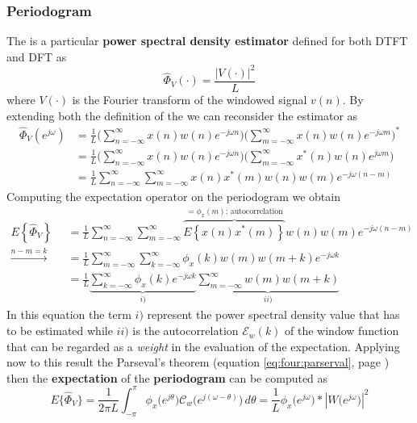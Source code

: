 		\subsubsection{Periodogram}
		The  is a particular \textbf{power spectral density estimator} defined for both DTFT and DFT as
		\begin{equation} \label{eq:dft:periodogram}
			\hat \Phi_V(\cdot) = \frac{|V(\cdot)|^2}{L}
		\end{equation}
		where $V(\cdot)$ is the Fourier transform of the windowed signal $v(n)$. By extending both the definition of the \dtft we can reconsider the estimator as
		\begin{align*}
			\hat \Phi_V(e^{j\omega}) & = \frac 1 L \Big( \sum_{n=-\infty}^\infty x(n) w(n) e^{-j\omega n} \Big)\Big( \sum_{m=-\infty}^\infty x(n) w(n) e^{-j\omega m} \Big)^* \\ & = \frac 1 L \Big( \sum_{n=-\infty}^\infty x(n) w(n) e^{-j\omega n} \Big) \Big( \sum_{m=-\infty}^\infty x^*(n) w(n) e^{j\omega m} \Big) \\ 
			& = \frac 1 L \sum_{n=-\infty}^\infty\sum_{m=-\infty}^\infty x(n) x^*(m) w(n) w(m) e^{-j\omega(n-m)}
		\end{align*}
		Computing the expectation operator on the periodogram we obtain
		\begin{align*}
			E\left\{ \hat \Phi_V \right\} & = \frac 1 L \sum_{n=-\infty}^\infty\sum_{m=-\infty}^\infty \overbrace{E\left\{x(n) x^*(m)\right\}}^{= \phi_x(m) \textrm{: autocorrelation}} w(n) w(m) e^{-j\omega(n-m)} \\
			\xrightarrow{n-m=k} \quad & = \frac 1 L \sum_{m=-\infty}^\infty \sum_{k=-\infty}^\infty \phi_x(k) w(m) w(m+k) e^{-j\omega k} \\
			& = \frac 1 L \underbrace{\sum_{k=-\infty}^\infty \phi_x(k) e^{-j\omega k}}_{i)} \underbrace{\sum_{m=-\infty}^\infty w(m) w(m+k)}_{ii)}
		\end{align*}
		In this equation the term $i)$ represent the power spectral density value that has to be estimated while $ii)$ is the autocorrelation $\mathcal E_w(k)$ of the window function that can be regarded as a \textit{weight} in the evaluation of the expectation. Applying now to this result the Parseval's theorem (equation \ref{eq:four:parserval}, page \pageref{eq:four:parserval}) then the \textbf{expectation} of the \textbf{periodogram} can be computed as
		\begin{equation} \label{eq:dft:asympunbiased}
			E\{ \hat \Phi_V \} = \frac 1 {2\pi L } \int_{-\pi}^{\pi} \phi_x\big( e^{j\theta}\big) \mathcal C_w \big(e^{j(\omega-\theta)}\big) \, d\theta = \frac 1 L \phi_x\big(e^{j\omega}\big) * \left|W\big(e^{j\omega}\big)\right|^2
		\end{equation}
